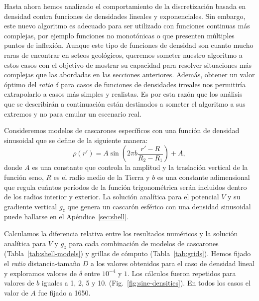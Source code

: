 Hasta ahora hemos analizado el comportamiento de la discretización basada en
densidad contra funciones de densidades lineales y exponenciales.
Sin embargo, este nuevo algoritmo es adecuado para ser utilizado con funciones
continuas más complejas, por ejemplo funciones no monotónicas o que presenten
múltiples puntos de inflexión.
Aunque este tipo de funciones de densidad son cuanto mucho raras de encontrar
en seteos geológicos, queremos someter nuestro algoritmo a estos casos con el
objetivo de mostrar su capacidad para resolver situaciones más complejas que
las abordadas en las secciones anteriores.
Además, obtener un valor óptimo del \emph{ratio} $\delta$ para casos de
funciones de densidades irreales nos permitiría extrapolarlo a casos más
simples y realistas.
Es por esta razón que los análisis que se describirán a continuación están
destinados a someter el algoritmo a sus extremos y no para emular un escenario
real.

Consideremos modelos de cascarones específicos con una función de densidad
sinusoidal que se define de la siguiente manera:
%
\begin{equation}
    \rho(r') = A \sin \left( 2 \pi b \frac{r' - R}{R_2 - R_1} \right) + A,
    \label{eq:density-sine}
\end{equation}
%
donde $A$ es una constante que controla la amplitud y la traslación
vertical de la función seno, $R$ es el radio medio de la Tierra y $b$ es una
constante adimensional que regula cuántos períodos de la función trigonométrica
serán incluidos dentro de los radios interior y exterior.
La solución analítica para el potencial $V$ y su gradiente vertical $g_z$ que
genera un cascarón esférico con una densidad sinusoidal puede hallarse en el
Apéndice~\ref{sec:shell}.

Calculamos la diferencia relativa entre los resultados numéricos y la solución
analítica para $V$ y $g_z$ para cada combinación de modelos de cascarones
(Tabla~\ref{tab:shell-models}) y grillas de cómputo (Tabla~\ref{tab:grids}).
Hemos fijado el \emph{ratio} distancia-tamaño $D$ a los valores obtenidos para
el caso de densidad lineal y exploramos valores de $\delta$ entre $10^{-4}$
y $1$.
Los cálculos fueron repetidos para valores de $b$ iguales a 1, 2, 5 y 10.
(Fig.~\ref{fig:sine-densities}). En todos los casos el valor de $A$ fue fijado
a 1650\kgpercubicm{}.

